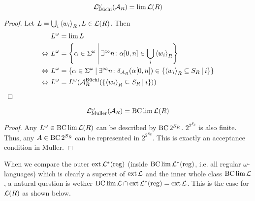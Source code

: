 \begin{lemma}
\label{gen:lang_omega_buechi}
\[ \mathcal{L}^\omega_{\text{Büchi}}(\mathcal{A}_R) = \lim \mathcal{L}(R) \]
\begin{proof}
Let $L = \bigcup_i \left< w_i\right>_R, L \in \mathcal{L}(R)$. Then
\begin{align*}
& L^\omega = \lim L \\
\Leftrightarrow \ & L^\omega = \Set{\alpha \in \Sigma^\omega}{\exists^\infty n \colon \alpha[0,n] \in \bigcup_i \left< w_i\right>_R} \\
\Leftrightarrow \ & L^\omega = \Set{\alpha \in \Sigma^\omega}{\exists^\infty n \colon \delta_{\A_R}(\alpha[0,n]) \in \Set{\left< w_i\right>_R \subseteq S_R}{i}} \\
\Leftrightarrow \ & L^\omega = L^\omega(\A^{\text{Büchi}}_R(\Set{\left< w_i\right>_R \subseteq S_R}{i}))
\end{align*}
\end{proof}
\end{lemma}

\begin{lemma}
\label{gen:lang_omega_muller}
\[ \mathcal{L}^\omega_{\text{Muller}}(\mathcal{A}_R) = \operatorname{BC} \lim \mathcal{L}(R) \]
\begin{proof}
Any $L^\omega \in \operatorname{BC} \lim \mathcal{L}(R)$ can be described by $\operatorname{BC} 2^{S_R}$. $2^{2^{S_R}}$ is also finite. Thus, any $A \in \operatorname{BC} 2^{S_R}$ can be represented in $2^{2^{S_R}}$. This is exactly an acceptance condition in Muller.
\end{proof}
\end{lemma}


When we compare the outer $\operatorname{ext} \mathcal{L}^*(\textup{\textrm{reg}})$ (inside $\operatorname{BC} \lim \mathcal{L}^*(\textup{\textrm{reg}})$, i.e. all regular $\omega$-languages) which is clearly a superset of $\operatorname{ext} \mathcal{L}$ and the inner whole class $\operatorname{BC} \lim \mathcal{L}$, a natural question is wether $\operatorname{BC} \lim \mathcal{L} \cap \operatorname{ext} \mathcal{L}^*(\textup{\textrm{reg}}) = \operatorname{ext} \mathcal{L}$. This is the case for $\mathcal{L}(R)$ as shown below.

